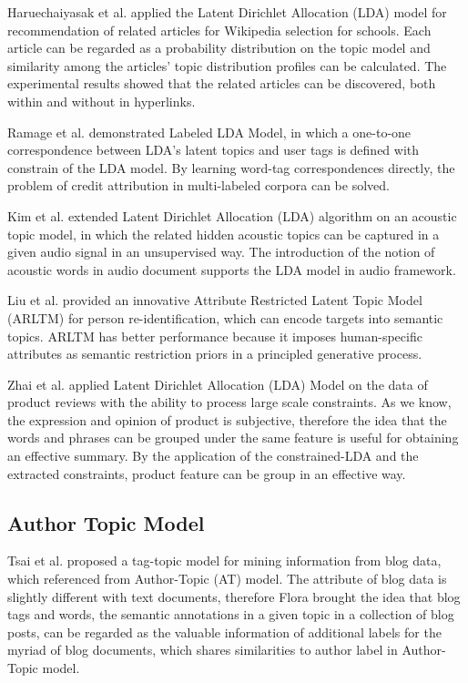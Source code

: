Haruechaiyasak et al. \cite{haruechaiyasak2008article} applied the Latent Dirichlet Allocation (LDA) model for recommendation of related articles for Wikipedia selection for schools. Each article can be regarded as a probability distribution on the topic model and similarity among the articles’ topic distribution profiles can be calculated. The experimental results showed that the related articles can be discovered, both within and without in hyperlinks. 

Ramage et al. \cite{ramage2009labeled} demonstrated Labeled LDA Model, in which a one-to-one correspondence between LDA’s latent topics and user tags is defined with constrain of the LDA model. By learning word-tag correspondences directly, the problem of credit attribution in multi-labeled corpora can be solved.

Kim et al. \cite{kim2009acoustic} extended Latent Dirichlet Allocation (LDA) algorithm on an acoustic topic model, in which the related hidden acoustic topics can be captured in a given audio signal in an unsupervised way. The introduction of the notion of acoustic words in audio document supports the LDA model in audio framework.

Liu et al. \cite{liu2012attribute} provided an innovative Attribute Restricted Latent Topic Model (ARLTM) for person re-identification, which can encode targets into semantic topics. ARLTM has better performance because it imposes human-specific attributes as semantic restriction priors in a principled generative process.

Zhai et al. \cite{zhai2011constrained} applied Latent Dirichlet Allocation (LDA) Model on the data of product reviews with the ability to process large scale constraints. As we know, the expression and opinion of product is subjective, therefore the idea that the words and phrases can be grouped under the same feature is useful for obtaining an effective summary. By the application of the constrained-LDA and the extracted constraints, product feature can be group in an effective way.

\subsection{Author Topic Model}
\label{subsec:atmApplication}

Tsai et al. \cite{tsai2011tag} proposed a tag-topic model for mining information from blog data, which referenced from Author-Topic (AT) model. The attribute of blog data is slightly different with text documents, therefore Flora brought the idea that blog tags and words, the semantic annotations in a given topic in a collection of blog posts, can be regarded as the valuable information of additional labels for the myriad of blog documents, which shares similarities to author label in Author-Topic model. 

